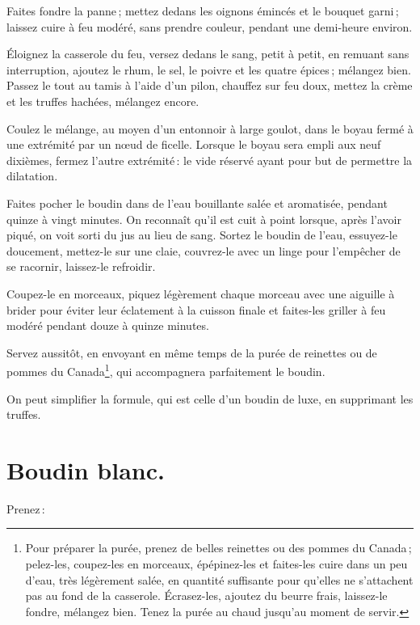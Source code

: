 Faites fondre la panne ; mettez dedans les oignons émincés et le bouquet
garni ; laissez cuire à feu modéré, sans prendre couleur, pendant une
demi-heure environ.

Éloignez la casserole du feu, versez dedans le sang, petit à petit, en remuant
sans interruption, ajoutez le rhum, le sel, le poivre et les quatre épices ;
mélangez bien. Passez le tout au tamis à l’aide d'un pilon, chauffez sur feu
doux, mettez la crème et les truffes hachées, mélangez encore.

Coulez le mélange, au moyen d'un entonnoir à large goulot, dans le boyau fermé
à une extrémité par un nœud de ficelle. Lorsque le boyau sera empli aux neuf
dixièmes, fermez l’autre extrémité : le vide réservé ayant pour but de
permettre la dilatation.

Faites pocher le boudin dans de l’eau bouillante salée et aromatisée, pendant
quinze à vingt minutes. On reconnaît qu'il est cuit à point lorsque, après
l'avoir piqué, on voit sorti du jus au lieu de sang. Sortez le boudin de l'eau,
essuyez-le doucement, mettez-le sur une claie, couvrez-le avec un linge pour
l'empêcher de se racornir, laissez-le refroidir.

Coupez-le en morceaux, piquez légèrement chaque morceau avec une aiguille
à brider pour éviter leur éclatement à la cuisson finale et faites-les griller
à feu modéré pendant douze à quinze minutes.

Servez aussitôt, en envoyant en même temps de la purée de reinettes ou de
pommes du Canada\footnote{Pour préparer la purée, prenez de belles reinettes ou
des pommes du Canada ; pelez-les, coupez-les en morceaux, épépinez-les et
faites-les cuire dans un peu d’eau, très légèrement salée, en quantité
suffisante pour qu'elles ne s'attachent pas au fond de la casserole.
Écrasez-les, ajoutez du beurre frais, laissez-le fondre, mélangez bien.
\protect\endgraf
Tenez la purée au chaud jusqu'au moment de servir.}, qui accompagnera
parfaitement le boudin.

\sk

On peut simplifier la formule, qui est celle d’un boudin de luxe, en supprimant
les truffes.

\section*{\centering Boudin blanc.}
{}

Prenez :

